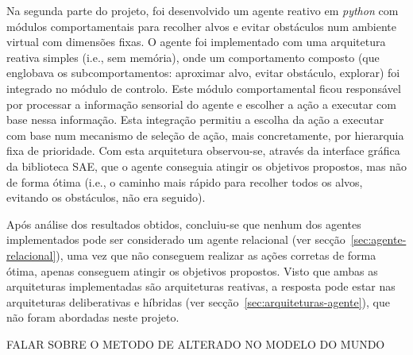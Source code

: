 Na segunda parte do projeto, foi desenvolvido um agente reativo em \textit{python} com módulos comportamentais para recolher alvos e evitar obstáculos num ambiente virtual com dimensões fixas.
O agente foi implementado com uma arquitetura reativa simples (i.e., sem memória), onde um comportamento composto (que englobava os subcomportamentos: aproximar alvo, evitar obstáculo, explorar) foi integrado no módulo de controlo.
Este módulo comportamental ficou responsável por processar a informação sensorial do agente e escolher a ação a executar com base nessa informação.
Esta integração permitiu a escolha da ação a executar com base num mecanismo de seleção de ação, mais concretamente, por hierarquia fixa de prioridade.
Com esta arquitetura observou-se, através da interface gráfica da biblioteca SAE, que o agente conseguia atingir os objetivos propostos, mas não de forma ótima (i.e., o caminho mais rápido para recolher todos os alvos, evitando os obstáculos, não era seguido).

Após análise dos resultados obtidos, concluiu-se que nenhum dos agentes implementados pode ser considerado um agente relacional (ver secção~\ref{sec:agente-relacional}), uma vez que não conseguem realizar as ações corretas de forma ótima, apenas conseguem atingir os objetivos propostos. Visto que ambas as arquiteturas implementadas são arquiteturas reativas, a resposta pode estar nas arquiteturas deliberativas e híbridas (ver secção~\ref{sec:arquiteturas-agente}), que não foram abordadas neste projeto.


FALAR SOBRE O METODO DE ALTERADO NO MODELO DO MUNDO
